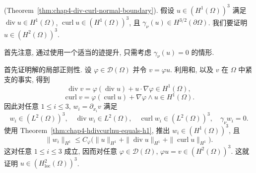 \begin{Proof}
(Theorem~\ref{thm:chap4-div-curl-normal-boundary}).
假设 $u\in(H^1(\Omega))^3$ 满足 $\operatorname{div}u\in H^1(\Omega)$, $\operatorname{curl}u\in(H^1(\Omega))^3$, 且 $\gamma_\nu(u)\in H^{3/2}(\partial\Omega)$. 我们要证明 $u\in(H^2(\Omega))^3$.

首先注意, 通过使用一个适当的迹提升, 只需考虑 $\gamma_\nu(u)=0$ 的情形.

首先证明解的局部正则性. 设 $\varphi\in\mathcal D(\Omega)$ 并令 $v=\varphi u$. 利用和, 以及 $v$ 在 $\Omega$ 中紧支的事实, 得到
\[
 \operatorname{div}v=\varphi(\operatorname{div}u)+u\cdot\nabla\varphi\in H^1(\Omega),
\]
\[
 \operatorname{curl}v=\varphi(\operatorname{curl}u)+\nabla\varphi\wedge u\in H^1(\Omega).
\]
因此对任意 $1\leq i\leq3$, $w_i=\partial_{x_i}v$ 满足
\[
 w_i\in(L^2(\Omega))^3,\quad
 \operatorname{div}w_i\in L^2(\Omega),\quad
 \operatorname{curl}w_i\in(L^2(\Omega))^3,\quad
 \gamma_\nu w_i=0.
\]
使用 Theorem~\ref{thm:chap4-hdivcurlnu-equals-h1}, 推出 $w_i\in(H^1(\Omega))^3$, 且
\[
 \|w_i\|_{H^1}\leq C_\varphi
 \bigl(\|u\|_{H^1}+\|\operatorname{div}u\|_{H^1}+\|\operatorname{curl}u\|_{H^1}\bigr).
\]
这对任意 $1\leq i\leq3$ 成立, 因而对任意 $\varphi\in\mathcal D(\Omega)$, $\varphi u=v\in(H^2(\Omega))^3$. 这就证明 $u\in(H_{\mathrm{loc}}^2(\Omega))^3$.


\end{Proof}
